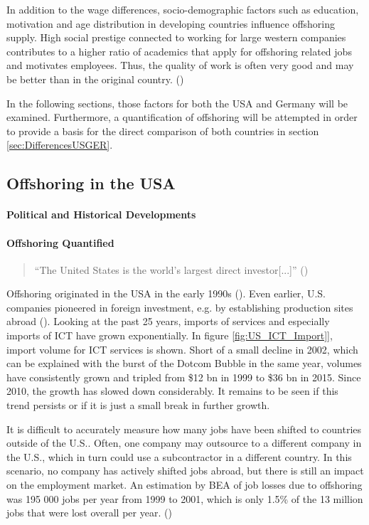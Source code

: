 In addition to the wage differences, socio-demographic factors such as education, motivation and age distribution in developing countries influence offshoring supply. High social prestige connected to working for large western companies contributes to a higher ratio of academics that apply for offshoring related jobs and motivates employees. Thus, the quality of work is often very good and may be better than in the original country. (\cite[p. 93]{Jahns.2007})

In the following sections, those factors for both the USA and Germany will be examined. Furthermore, a quantification of offshoring will be attempted in order to provide a basis for the direct comparison of both countries in section \ref{sec:DifferencesUSGER}.

\subsection{Offshoring in the USA}
\label{sec:OffshoringUS}

\paragraph{Political and Historical Developments}

\paragraph{Offshoring Quantified}
\begin{quote}
	``The United States is the world's largest direct investor[...]'' \linebreak(\cite[p. 3]{Kozlow.2006})
\end{quote}

Offshoring originated in the USA in the early 1990s (\cite[p. 389]{Pisani.2016}). Even earlier, U.S. companies pioneered in foreign investment, e.g. by establishing production sites abroad (\cite[p. 5]{Kozlow.2006}). Looking at the past 25 years, imports of services and especially imports of \ac{ICT} have grown exponentially. In figure \ref{fig:US_ICT_Import}], import volume for ICT services is shown. Short of a small decline in 2002, which can be explained with the burst of the Dotcom Bubble in the same year, volumes have consistently grown and tripled from \$12 bn in 1999 to \$36 bn in 2015. Since 2010, the growth has slowed down considerably. It remains to be seen if this trend persists or if it is just a small break in further growth.

It is difficult to accurately measure how many jobs have been shifted to countries outside of the U.S.. Often, one company may outsource to a different company in the U.S., which in turn could use a subcontractor in a different country. In this scenario, no company has actively shifted jobs abroad, but there is still an impact on the employment market. An estimation by \ac{BEA} of job losses due to offshoring was 195 000 jobs per year from 1999 to 2001, which is only 1.5\% of the 13 million jobs that were lost overall per year. (\cite[pp. 14ff]{Kozlow.2006})



